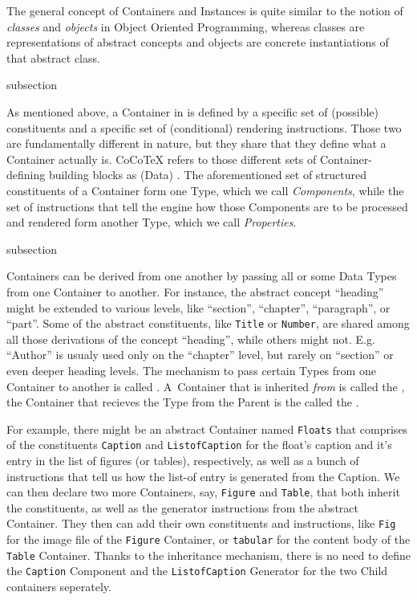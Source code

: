 The general concept of Containers and Instances is quite similar to
the notion of \textit{classes} and \textit{objects} in Object Oriented
Programming, whereas classes are representations of abstract concepts
and objects are concrete instantiations of that abstract class.


\begin{Heading}{subsection}
\end{Heading}

As mentioned above, a Container in {\CoCoTeX} is defined by a specific
set of (possible) constituents and a specific set of (conditional)
rendering instructions.  Those two are fundamentally different in
nature, but they share that they define what a Container actually
is. CoCoTeX refers to those different sets of Container-defining
building blocks as (Data) .  The aforementioned
set of structured constituents of a Container form one Type, which we
call \textit{Components}, while the set of instructions that tell the
engine how those Components are to be processed and rendered form
another Type, which we call \textit{Properties}.


\begin{Heading}{subsection}
\end{Heading}

Containers can be derived from one another by passing all or some Data
Types from one Container to another. For instance, the abstract
concept “heading” might be extended to various levels, like “section”,
“chapter”, “paragraph”, or “part”. Some of the abstract constituents,
like \texttt{Title} or \texttt{Number}, are shared among all those
derivations of the concept “heading”, while others might
not. E.g. “Author” is usualy used only on the “chapter” level, but
rarely on “section” or even deeper heading levels. The mechanism to
pass certain Types from one Container to another is called
. A~Container that is inherited \textit{from} is
called the , the Container that recieves
the Type from the Parent is the called the .

For example, there might be an abstract Container named
\texttt{Floats} that comprises of the constituents \texttt{Caption}
and \texttt{ListofCaption} for the float's caption and it's entry in
the list of figures (or tables), respectively, as well as a bunch of
instructions that tell us how the list-of entry is generated from the
Caption. We can then declare two more Containers, say, \texttt{Figure}
and \texttt{Table}, that both inherit the constituents, as well as the
generator instructions from the abstract Container. They then can add
their own constituents and instructions, like \texttt{Fig} for the
image file of the \texttt{Figure} Container, or \texttt{tabular} for
the content body of the \texttt{Table} Container. Thanks to the
inheritance mechanism, there is no need to define the \texttt{Caption}
Component and the \texttt{ListofCaption} Generator for the two Child
containers seperately.



